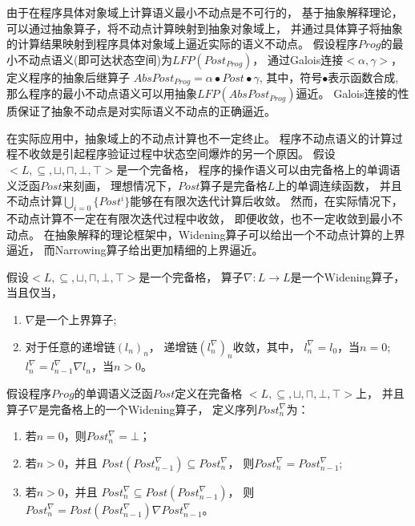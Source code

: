 由于在程序具体对象域上计算语义最小不动点是不可行的，
基于抽象解释理论，可以通过抽象算子，将不动点计算映射到抽象对象域上，
并通过具体算子将抽象的计算结果映射到程序具体对象域上逼近实际的语义不动点。
假设程序$Prog$的最小不动点语义(即可达状态空间)为$LFP(Post_{Prog})$，
通过Galois连接$<\alpha, \gamma>$，定义程序的抽象后继算子
$AbsPost_{Prog} = \alpha \bullet Post \bullet \gamma$,
其中，符号$\bullet$表示函数合成,
那么程序的最小不动点语义可以用抽象$LFP(AbsPost_{Prog})$逼近。
Galois连接的性质保证了抽象不动点是对实际语义不动点的正确逼近。

在实际应用中，抽象域上的不动点计算也不一定终止。
程序不动点语义的计算过程不收敛是引起程序验证过程中状态空间爆炸的另一个原因。
假设$<L,\subseteq, \sqcup, \sqcap, \bot,\top>$是一个完备格，
程序的操作语义可以由完备格上的单调语义泛函$Post$来刻画，
理想情况下，$Post$算子是完备格$L$上的单调连续函数，
并且不动点计算$\bigcup_{i=0}\{Post^{i}\}$能够在有限次迭代计算后收敛。
然而，在实际情况下，不动点计算不一定在有限次迭代过程中收敛，
即便收敛，也不一定收敛到最小不动点。
在抽象解释的理论框架中，Widening算子可以给出一个不动点计算的上界逼近，
而Narrowing算子给出更加精细的上界逼近。

\begin{definition}[Widening算子]
假设$<L,\subseteq, \sqcup, \sqcap, \bot,\top>$是一个完备格，
算子$\nabla: L \rightarrow L$是一个Widening算子，当且仅当，
\begin{enumerate}
\item $\nabla$是一个上界算子;
\item 对于任意的递增链$(l_n)_n$，
递增链$(l_{n}^{\nabla})_n$收敛，其中，
$l_{n}^{\nabla} = l_0$，当$n=0$;
 $l_{n}^{\nabla} = l_{n-1}^{\nabla} \nabla l_n$，当$n>0$。
\end{enumerate}
\end{definition}

假设程序$Prog$的单调语义泛函$Post$定义在完备格
$<L,\subseteq, \sqcup, \sqcap, \bot,\top>$上，
并且算子$\nabla$是完备格上的一个Widening算子，
定义序列$Post_{n}^{\nabla}$为：

\begin{enumerate}
\item 若$n=0$，则$Post_{n}^{\nabla} = \bot$；
\item 若$n > 0$，并且
$Post(Post_{n-1}^{\nabla}) \subseteq Post_{n}^{\nabla}$，
则$Post_{n}^{\nabla} = Post_{n-1}^{\nabla}$;
\item 若$n > 0$，并且
$Post_{n}^{\nabla} \subseteq Post(Post_{n-1}^{\nabla})$，
则$Post_{n}^{\nabla} = Post(Post_{n-1}^{\nabla}) \nabla  Post_{n-1}^{\nabla}$。
\end{enumerate}

